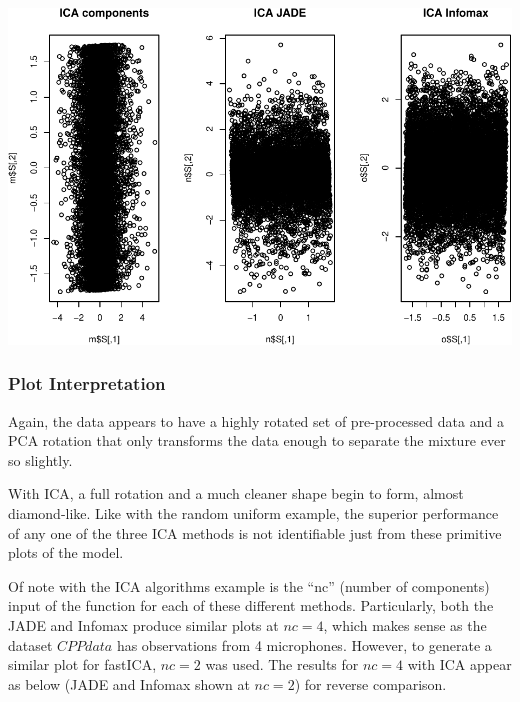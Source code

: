 \documentclass[12pt,twoside]{amherstthesis}
\begin{document}
  \begin{center}\includegraphics{ICAStatsComps_files/figure-latex/unnamed-chunk-9-2} \end{center}
  
  \subsubsection{Plot Interpretation}\label{plot-interpretation-1}
  
  Again, the data appears to have a highly rotated set of pre-processed
  data and a PCA rotation that only transforms the data enough to separate
  the mixture ever so slightly.
  
  With ICA, a full rotation and a much cleaner shape begin to form, almost
  diamond-like. Like with the random uniform example, the superior
  performance of any one of the three ICA methods is not identifiable just
  from these primitive plots of the model.
  
  Of note with the ICA algorithms example is the ``nc'' (number of
  components) input of the function for each of these different methods.
  Particularly, both the JADE and Infomax produce similar plots at
  \(nc=4\), which makes sense as the dataset \(CPPdata\) has observations
  from 4 microphones. However, to generate a similar plot for fastICA,
  \(nc=2\) was used. The results for \(nc=4\) with ICA appear as below
  (JADE and Infomax shown at \(nc=2\)) for reverse comparison.
  
\end{document}

